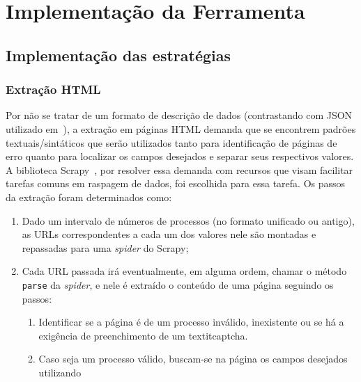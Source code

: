\chapter{Implementação da Ferramenta \tjscraper~\label{chp:implementação-da-ferramenta}}

\section{Implementação das estratégias}


\subsection{Extração HTML}

Por não se tratar de um formato de descrição de dados (contrastando com JSON
utilizado em~), a extração em páginas HTML
demanda que se encontrem padrões textuais/sintáticos que serão utilizados tanto
para identificação de páginas de erro quanto para localizar os campos desejados
e separar seus respectivos valores. A biblioteca Scrapy~\cite{lib:scrapy}, por
resolver essa demanda com recursos que visam facilitar tarefas comuns em
raspagem de dados, foi escolhida para essa tarefa. Os passos da extração foram
determinados como:

\begin{enumerate}
    \item Dado um intervalo de números de processos (no formato unificado ou
        antigo), as URLs correspondentes a cada um dos valores nele são
        montadas e repassadas para uma \textit{spider} do Scrapy;
    \item \label{step-1} Cada URL passada irá eventualmente, em alguma ordem, chamar o método
        \texttt{parse} da \textit{spider}, e nele é extraído o conteúdo de uma
        página seguindo os passos:

        \begin{enumerate}
            \item Identificar se a página é de um processo inválido,
                inexistente ou se há a exigência de preenchimento de um
                textit{captcha}.
            \item Caso seja um processo válido, buscam-se na página os campos
                desejados utilizando
        \end{enumerate}
\end{enumerate}

